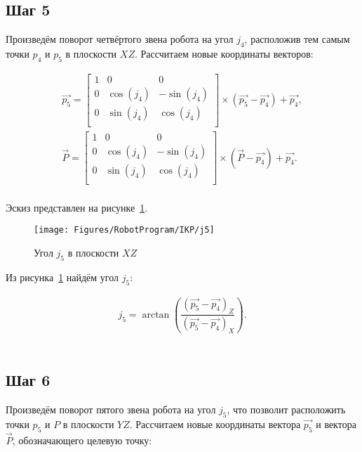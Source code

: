\subsection*{Шаг 5}
Произведём поворот четвёртого звена робота на угол $j_4$, расположив тем самым точки $p_4$ и $p_5$ в плоскости $XZ$.
Рассчитаем новые координаты векторов:

\begin{gather*}
    \overrightarrow{p_5} =
    \begin{bmatrix}
        1 & 0         & 0          \\
        0 & \cos(j_4) & -\sin(j_4) \\
        0 & \sin(j_4) & \cos(j_4)  \\
    \end{bmatrix} \times \left( \overrightarrow{p_5} - \overrightarrow{p_4} \right) + \overrightarrow{p_4}, \\
    \overrightarrow{P} =
    \begin{bmatrix}
        1 & 0         & 0          \\
        0 & \cos(j_4) & -\sin(j_4) \\
        0 & \sin(j_4) & \cos(j_4)  \\
    \end{bmatrix} \times \left( \overrightarrow{P} - \overrightarrow{p_4} \right) + \overrightarrow{p_4}.
\end{gather*} \\

Эскиз представлен на рисунке~\ref{fig:RobotProgram:IKP:j5}.

\begin{figure}[H]
    \centering
    \vspace{14pt}
    \texttt{[image: Figures/RobotProgram/IKP/j5]}
    \caption{Угол $j_5$ в плоскости $XZ$}
    \label{fig:RobotProgram:IKP:j5}
\end{figure}

Из рисунка~\ref{fig:RobotProgram:IKP:j5} найдём угол $j_5$:

\begin{gather*}
    j_5 = \arctan \left( \dfrac
    {\left( \overrightarrow{p_5} - \overrightarrow{p_4} \right)_Z}
    {\left( \overrightarrow{p_5} - \overrightarrow{p_4} \right)_X} \right).
\end{gather*} \\

\subsection*{Шаг 6}
Произведём поворот пятого звена робота на угол $j_5$, что позволит расположить точки $p_5$ и $P$ в плоскости $YZ$.
Рассчитаем новые координаты вектора $\overrightarrow{p_5}$ и вектора $\overrightarrow{P}$, обозначающего целевую точку:

